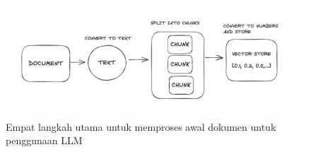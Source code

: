 \begin{figure}[htbp]
  \centering
  \includegraphics[width=0.85\linewidth]{images/bab-2/llm-process.png}
  \caption{Empat langkah utama untuk memproses awal dokumen untuk penggunaan LLM}\label{fig:langchain-pipeline}\citep{bagui2023database}
\end{figure}